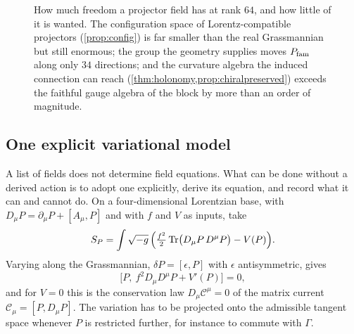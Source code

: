 \begin{figure}[t]
\centering
{}
\caption{How much freedom a projector field has at rank $64$, and how little of it is wanted. The configuration space of
Lorentz-compatible projectors (\cref{prop:config}) is far smaller than the real Grassmannian but still enormous; the group the
geometry supplies moves $P_{\rm fam}$ along only $34$ directions; and the curvature algebra the induced connection can reach
(\cref{thm:holonomy,prop:chiralpreserved}) exceeds the faithful gauge algebra of the block by more than an order of magnitude.}
\label{fig:freedom}
\end{figure}

\subsection{One explicit variational model}
\label{sec:trialaction}

A list of fields does not determine field equations. What can be done without a derived action is to adopt one explicitly, derive
its equation, and record what it can and cannot do. On a four-dimensional Lorentzian base, with $D_\mu P=\partial_\mu P+[A_\mu,P]$ and
with $f$ and $V$ as inputs, take
\begin{equation}
\label{eq:trialS}
S_P=\int\sqrt{-g}\,\Bigl(\tfrac{f^2}2\operatorname{Tr}\bigl(D_\mu P\,D^\mu P\bigr)-V(P)\Bigr).
\end{equation}
Varying along the Grassmannian, $\delta P=[\epsilon,P]$ with $\epsilon$ antisymmetric, gives
\begin{equation}
\label{eq:Pieom}
\bigl[P,\ f^2D_\mu D^\mu P+V'(P)\bigr]=0 ,
\end{equation}
and for $V=0$ this is the conservation law $D_\mu\mathcal C^\mu=0$ of the matrix current $\mathcal C_\mu=[P,D_\mu P]$. The variation
has to be projected onto the admissible tangent space whenever $P$ is restricted further, for instance to commute with $\Gamma$.

